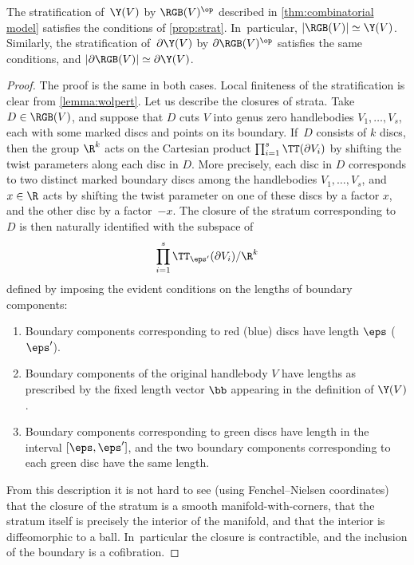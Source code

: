 \begin{thm}\label{thm:combinatorial model 2} The stratification of $\,\Y(V)$ by $\RGB(V)^\op$ described in \cref{thm:combinatorial model} satisfies the conditions of \cref{prop:strat}. In~particular, $|\RGB(V)| \simeq \Y(V)$. Similarly, the stratification of $\,\partial \Y(V)$ by $\partial\RGB(V)^\op$ satisfies the same conditions, and $|\partial \RGB(V)| \simeq \partial\Y(V)$.
\end{thm}

\begin{proof}The proof is the same in both cases.
Local finiteness of the stratification is clear from \cref{lemma:wolpert}. Let us describe the closures of strata. Take $D \in \RGB(V)$, and suppose that $D$ cuts $V$ into genus zero handlebodies $V_1,\dots,V_s$, each with some marked discs and points on its boundary. If~$D$ consists of $k$ discs, then the group $\R^k$ acts on the Cartesian product
$\prod_{i=1}^s \TT(\partial V_i)$ by shifting the twist parameters along each disc in $D$. More precisely, each disc in $D$ corresponds to two distinct marked boundary discs among the handlebodies $V_1,\dots,V_s$, and $x \in \R$ acts by shifting the twist parameter on one of these discs by a factor $x$, and the other disc by a factor~$-x$. The closure of the stratum corresponding to $D$ is then naturally identified with the subspace of\vspace*{-3pt}\enlargethispage{.5\baselineskip}
\[
\prod_{i=1}^s \TT_{\eps'}(\partial V_i)/\R^k
\]
defined by imposing the evident conditions on the lengths of boundary components:
\begin{enumerate}
\item Boundary components corresponding to red (\resp blue) discs have length $\eps$ (\resp $\eps'$).
\item Boundary components of the original handlebody $V$ have lengths as prescribed by the fixed length vector $\bb$ appearing in the definition of $\Y(V)$.
\item Boundary components corresponding to green discs have length in the interval $[\eps,\eps']$, and the two boundary components corresponding to each green disc have the same length.
\end{enumerate}
From this description it is not hard to see (using Fenchel--Nielsen coordinates) that the closure of the stratum is a smooth manifold-with-corners, that the stratum itself is precisely the interior of the manifold, and that the interior is diffeomorphic to a ball. In~particular the closure is contractible, and the inclusion of the boundary is a cofibration.
\end{proof}

